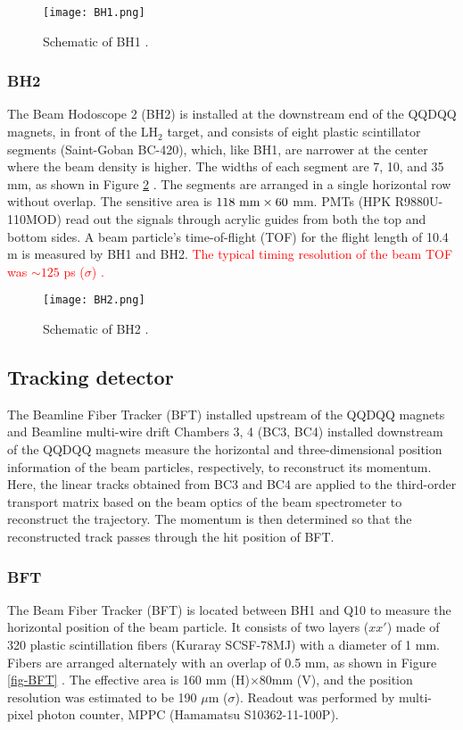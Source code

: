 \begin{figure}[!h]
 \begin{center}
   \texttt{[image: BH1.png]}
   \caption{Schematic of BH1 \cite{Honda-D}.}
   \label{fig-BH1}
 \end{center}
\end{figure}

\subsubsection{BH2}
The Beam Hodoscope 2 (BH2) \cite{BH2} is installed at the downstream end of the QQDQQ magnets, in front of the LH$_2$ target, and consists of eight plastic scintillator segments (Saint-Goban BC-420), which, like BH1, are narrower at the center where the beam density is higher. The widths of each segment are 7, 10, and 35 mm, as shown in Figure \ref{fig-BH2} \cite{Honda-D}. The segments are arranged in a single horizontal row without overlap. The sensitive area is $118\ \rm{mm}\times60$ mm. PMTs (HPK R9880U-110MOD) read out the signals through acrylic guides from both the top and bottom sides. A beam particle's time-of-flight (TOF) for the flight length of 10.4 m is measured by BH1 and BH2. \textcolor{red}{The typical timing resolution of the beam TOF was $\sim125$ ps ($\sigma$) \cite{BH2}.}

\begin{figure}[!h]
 \begin{center}
   \texttt{[image: BH2.png]}
   \caption{Schematic of BH2 \cite{Honda-D}.}
   \label{fig-BH2}
 \end{center}
\end{figure}

\subsection{Tracking detector}
The Beamline Fiber Tracker (BFT) installed upstream of the QQDQQ magnets and Beamline multi-wire drift Chambers 3, 4 (BC3, BC4) installed downstream of the QQDQQ magnets measure the horizontal and three-dimensional position information of the beam particles, respectively, to reconstruct its momentum. Here, the linear tracks obtained from BC3 and BC4 are applied to the third-order transport matrix based on the beam optics of the beam spectrometer to reconstruct the trajectory. The momentum is then determined so that the reconstructed track passes through the hit position of BFT.

\subsubsection{BFT}
The Beam Fiber Tracker (BFT) is located between BH1 and Q10 to measure the horizontal position of the beam particle. It consists of two layers ($xx'$) made of 320 plastic scintillation fibers (Kuraray SCSF-78MJ) with a diameter of 1 mm. Fibers are arranged alternately with an overlap of 0.5 mm, as shown in Figure \ref{fig-BFT} \cite{Honda-D}. The effective area is 160 mm (H)$\times$80mm (V), and the position resolution was estimated to be 190 $\mu$m ($\sigma$). Readout was performed by multi-pixel photon counter, MPPC (Hamamatsu S10362-11-100P).

